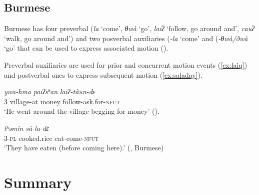 \documentclass[oneside,a4paper,11pt]{article}
\newcommand{\ipa}[1]{{\phon\textit{#1}}}
\newcommand{\rouge}[1]{{\color{red}#1}}
\begin{document}
\subsection{Burmese}
Burmese has four preverbal (\ipa{la} `come', \ipa{θwà}  `go', \ipa{laiʔ} `follow, go around and', \ipa{cauʔ} `walk, go around and') and two posverbal auxiliaries (\ipa{-la} `come' and (\ipa{-θwà/ðwà} `go' that can be used to express associated motion (\citealt[185-190;203-5]{Jenny16grammar}).

Preverbal auxiliaries are used for prior and concurrent motion events (\ref{ex:laiq}) and postverbal ones to express subsequent motion (\ref{ex:saladay}).

 \begin{exe}
\ex \label{ex:laiq}
\gll   \ipa{θu}	\ipa{ywa-hma}	\ipa{paiʔsʰan}	\ipa{\rouge{laiʔ}-tàun-dɛ}  \\
3 village-at  money \rouge{follow}-ask.for-\textsc{nfut} \\
\glt `He went around the village begging for money' (\citealt[189]{Jenny16grammar}).
\end{exe}

 \begin{exe}
\ex \label{ex:saladay}
\gll   \ipa{θu-dó}	\ipa{tʰəmìn}	\ipa{sà-\rouge{la}-dɛ} \\
3-\textsc{pl} cooked.rice eat-\rouge{come}-\textsc{nfut}  \\
\glt ‘They have eaten (\rouge{before coming here}).' (\citet[388]{Jenny16grammar}, Burmese)
\end{exe}
 

\section{Summary}
\end{document}
